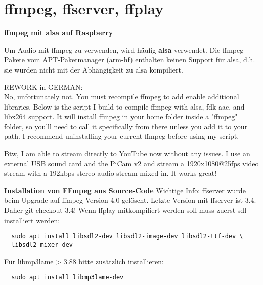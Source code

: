 \section{ffmpeg, ffserver, ffplay} \label{RefFFmpeg}
\textbf{ffmpeg mit alsa auf Raspberry }

Um Audio mit ffmpeg zu verwenden, wird häufig \textbf{alsa} verwendet. Die ffmpeg Pakete vom APT-Paketmanager (arm-hf) enthalten keinen Support für alsa, d.h. sie wurden nicht mit der Abhängigkeit zu alsa kompiliert.
   
\color{red}
REWORK in GERMAN:\\
No, unfortunately not. You must recompile ffmpeg to add enable additional libraries. Below is the script I build to compile ffmpeg with alsa, fdk-aac, and libx264 support. It will install ffmpeg in your home folder inside a "ffmpeg" folder, so you'll need to call it specifically from there unless you add it to your path. I recommend uninstalling your current ffmpeg before using my script.

Btw, I am able to stream directly to YouTube now without any issues. I use an external USB sound card and the PiCam v2 and stream a 1920x1080@25fps video stream with a 192kbps stereo audio stream mixed in. It works great!
\color{black}

\textbf{Installation von FFmpeg aus Source-Code}
Wichtige Info: ffserver wurde beim Upgrade auf ffmpeg Version 4.0 gelöscht. Letzte Version mit ffserver ist 3.4. Daher git checkout 3.4! Wenn ffplay mitkompiliert werden soll muss zuerst sdl installiert werden:
\begin{verbatim}
  sudo apt install libsdl2-dev libsdl2-image-dev libsdl2-ttf-dev \
  libsdl2-mixer-dev
\end{verbatim}

Für libmp3lame > 3.88 bitte zusätzlich installieren:
\begin{verbatim}
  sudo apt install libmp3lame-dev
\end{verbatim}

